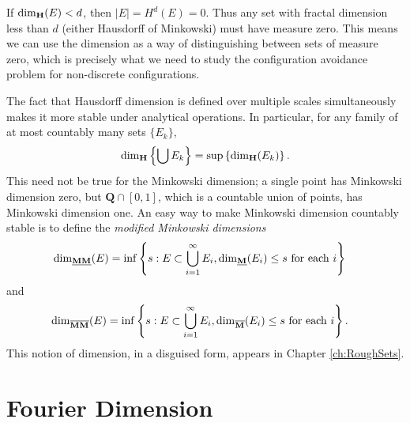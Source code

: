 \begin{remark}
	If $\operatorname{\dim_{\mathbf{H}}}(E) < d$, then $|E| = H^d(E) = 0$. Thus any set with fractal dimension less than $d$ (either Hausdorff of Minkowski) must have measure zero. This means we can use the dimension as a way of distinguishing between sets of measure zero, which is precisely what we need to study the configuration avoidance problem for non-discrete configurations.
\end{remark}

The fact that Hausdorff dimension is defined over multiple scales simultaneously makes it more stable under analytical operations. In particular, for any family of at most countably many sets $\{ E_k \}$,
%
\[ \operatorname{\dim_{\mathbf{H}}} \left\{ \bigcup E_k \right\} = \sup \left\{ \operatorname{\dim_{\mathbf{H}}}(E_k) \right\}. \]
%
This need not be true for the Minkowski dimension; a single point has Minkowski dimension zero, but $\mathbf{Q} \cap [0,1]$, which is a countable union of points, has Minkowski dimension one. An easy way to make Minkowski dimension countably stable is to define the \emph{modified Minkowski dimensions}
%
\begin{align*}
	\operatorname{\dim_{\underline{\mathbf{MM}}}}(E) &= \inf \left\{ s : E \subset \bigcup_{i = 1}^\infty E_i, \operatorname{\dim_{\underline{\mathbf{M}}}}(E_i) \leq s\ \text{for each $i$} \right\}
\end{align*}
%
and
%
\begin{align*}
	\operatorname{\dim_{\overline{\mathbf{MM}}}}(E) &= \inf \left\{ s : E \subset \bigcup_{i = 1}^\infty E_i, \operatorname{\dim_{\overline{\mathbf{M}}}}(E_i) \leq s\ \text{for each $i$} \right\}.
\end{align*}
%
This notion of dimension, in a disguised form, appears in Chapter \ref{ch:RoughSets}.







\section{Fourier Dimension}

